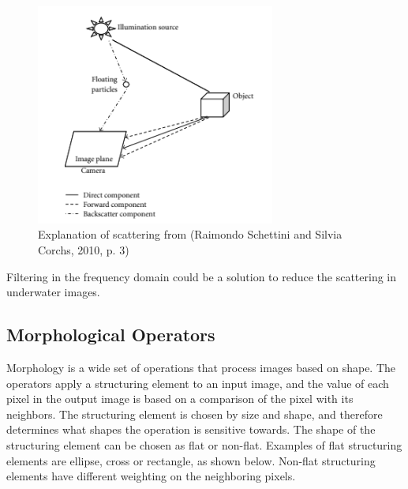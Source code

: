 \begin{figure}[h]
    \centering
    \includegraphics[width=0.7\textwidth]{images/image_from_paper}
    \caption{Explanation of scattering from (Raimondo Schettini and Silvia Corchs, 2010, p. 3)}
    \label{fig:image_from_paper}
\end{figure}

Filtering in the frequency domain could be a solution to reduce the scattering in underwater images.




\subsection{Morphological Operators}

Morphology is a wide set of operations that process images based on shape. The operators apply a structuring element to an input image, and the value of each pixel in the output image is based on a comparison of the pixel with its neighbors. The structuring element is chosen by size and shape, and therefore determines what shapes the operation is sensitive towards. 
The shape of the structuring element can be chosen as flat or non-flat. Examples of flat structuring elements are ellipse, cross or rectangle, as shown below. Non-flat structuring elements have different weighting on the neighboring pixels. 

